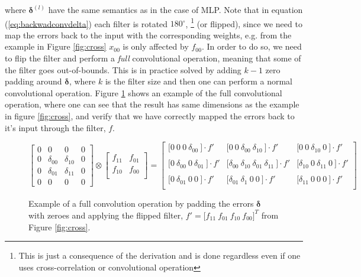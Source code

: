 where $\boldsymbol{\delta}^{(l)}$ have the same semantics as in the case of MLP.
Note that in equation (\ref{eq:backwadconvdelta}) each filter is rotated
$180^\circ$, \footnote{This is just a consequence of the derivation and is done
	regardless even if one uses cross-correlation or convolutional operation} (or
flipped), since we need to map the errors back to the input with the
corresponding weights, e.g. from the example in Figure \ref{fig:cross} $x_{00}$
is only affected by $f_{00}$. In order to do so, we need to flip the filter and
perform a \emph{full} convolutional operation, meaning that some of the filter
goes out-of-bounds. This is in practice solved by adding $k-1$ zero padding
around $\boldsymbol{\delta}$, where $k$ is the filter size and then one can
perform a normal convolutional operation.  Figure \ref{padding} shows an example
of the full convolutional operation, where one can see that the result has same
dimensions as the example in figure \ref{fig:cross}, and verify that we have
correctly mapped the errors back to it's input through the filter, $f$. 
\begin{figure}[!hbtp]
	\centering 
	\begin{displaymath}
	\begin{bmatrix}
	0 &	0 & 0 & 0    \\ 
	0 & \delta_{00} & \delta_{10} &  0  \\ 
	0 & \delta_{01} & \delta_{11} &  0  \\ 
	0 &	0 & 0 & 0  
	\end{bmatrix}	
	\otimes 
	\begin{bmatrix}
	f_{11} & f_{01} \\ 
	f_{10} & f_{00}  \\  
	\end{bmatrix}	
	= 
	\begin{bmatrix}
	\lbrack 0 \  0 \  0 \  \delta_{00} \ \rbrack \cdot f'   & \lbrack 0 \ 0\ 
	\delta_{00} \  \delta_{10} \ \rbrack \cdot f' & \lbrack 0 \  0 \  \delta_{10} \
	0  \ \rbrack \cdot f' \\  \\
	\lbrack 0 \ \delta_{00} \  0 \  \delta_{01} \ \rbrack \cdot f' & \lbrack
	\delta_{00} \ \delta_{10} \  \delta_{01} \  \delta_{11} \ \rbrack \cdot f' &
	\lbrack \delta_{10} \  0 \  \delta_{11} \ 0  \ \rbrack   \cdot f' \\ \\
	\lbrack 0 \ \delta_{01} \  0 \  0 \ \rbrack  \cdot f' & \lbrack \delta_{01} \
	\delta_{1} \  0 \  0 \ \rbrack \cdot f' & \lbrack \delta_{11} \  0 \  0 \ 0  \
	\rbrack \cdot f' \\ 
	\end{bmatrix}
	\end{displaymath}
	\caption{Example of a full convolution operation by padding the errors
		$\boldsymbol{\delta}$ with zeroes and applying the flipped filter, $f' = \lbrack
		f_{11}\ f_{01} \ f_{10} \ f_{00} \rbrack^T$ from Figure \ref{fig:cross}.}
	\label{padding}
\end{figure} \newline 
